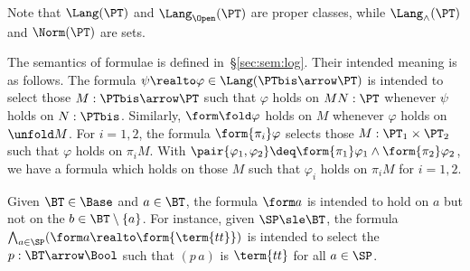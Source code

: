 \noindent
Note that $\Lang(\PT)$ and $\Lang_{\Open}(\PT)$ are proper classes,
while $\Lang_{\land}(\PT)$ and $\Norm(\PT)$ are sets.


The semantics of formulae is defined in~\S\ref{sec:sem:log}.
Their intended meaning is as follows.
The formula $\psi \realto \varphi \in \Lang(\PTbis \arrow \PT)$
is intended to select those $M : \PTbis \arrow \PT$
such that $\varphi$ holds on $M N : \PT$ whenever $\psi$ holds on $N : \PTbis$.
%
Similarly, $\form\fold \varphi$ holds on $M$ whenever
$\varphi$ holds on $\unfold M$.
%
%
For $i = 1,2$,
the formula $\form{\pi_i} \varphi$
selects those $M : \PT_1 \times \PT_2$
such that $\varphi$ holds on $\pi_i M$.
%
With
$\pair{\varphi_1,\varphi_2} \deq \form{\pi_1}\varphi_1 \land \form{\pi_2} \varphi_2$,
we have a formula which holds on those $M$ such that
$\varphi_i$ holds on $\pi_i M$ for $i = 1,2$.



\begin{example}
\label{ex:form:base}
Given $\BT \in \Base$ and $a \in \BT$,
the formula $\form a$ is intended to hold
on $a$ but not on the $b \in \BT \setminus \{a\}$.
For instance, given $\SP \sle \BT$, the formula
$\bigwedge_{a \in \SP}(\form a \realto \form{\term{tt}})$
is intended to select the $p : \BT \arrow \Bool$
such that $(p\, a)$ is $\term{tt}$ for all $a \in \SP$.
\end{example}



